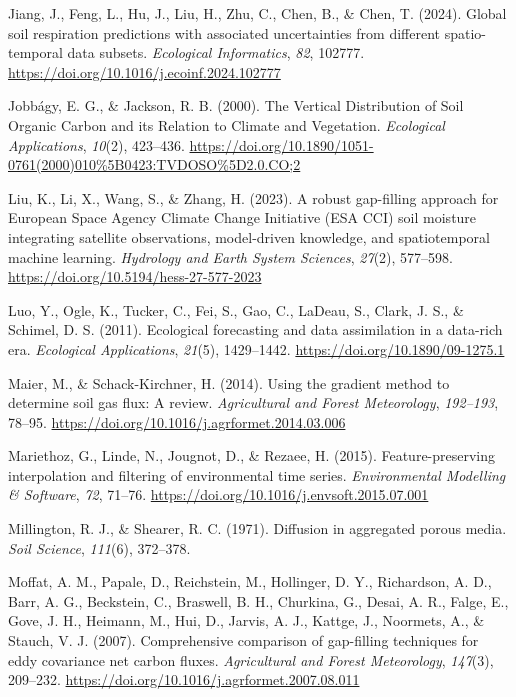 \documentclass[
  letterpaper,
  DIV=11,
  numbers=noendperiod]{scrartcl}
\newlength{\cslhangindent}
\newenvironment{CSLReferences}[2] %
 {\begin{list}{}{%
  \setlength{\itemindent}{0pt}
  \setlength{\leftmargin}{0pt}
  \setlength{\parsep}{0pt}
  \ifodd #1
   \setlength{\leftmargin}{\cslhangindent}
   \setlength{\itemindent}{-1\cslhangindent}
  \fi
  \setlength{\itemsep}{#2\baselineskip}}}
 {\end{list}}
\begin{document}
\begin{CSLReferences}{1}{0}
Jiang, J., Feng, L., Hu, J., Liu, H., Zhu, C., Chen, B., \& Chen, T.
(2024). Global soil respiration predictions with associated
uncertainties from different spatio-temporal data subsets.
\emph{Ecological Informatics}, \emph{82}, 102777.
\url{https://doi.org/10.1016/j.ecoinf.2024.102777}

Jobbágy, E. G., \& Jackson, R. B. (2000). The {Vertical Distribution} of
{Soil Organic Carbon} and its {Relation} to {Climate} and {Vegetation}.
\emph{Ecological Applications}, \emph{10}(2), 423--436.
\url{https://doi.org/10.1890/1051-0761(2000)010\%5B0423:TVDOSO\%5D2.0.CO;2}

Liu, K., Li, X., Wang, S., \& Zhang, H. (2023). A robust gap-filling
approach for {European Space Agency Climate Change Initiative} ({ESA
CCI}) soil moisture integrating satellite observations, model-driven
knowledge, and spatiotemporal machine learning. \emph{Hydrology and
Earth System Sciences}, \emph{27}(2), 577--598.
\url{https://doi.org/10.5194/hess-27-577-2023}

Luo, Y., Ogle, K., Tucker, C., Fei, S., Gao, C., LaDeau, S., Clark, J.
S., \& Schimel, D. S. (2011). Ecological forecasting and data
assimilation in a data-rich era. \emph{Ecological Applications},
\emph{21}(5), 1429--1442. \url{https://doi.org/10.1890/09-1275.1}

Maier, M., \& Schack-Kirchner, H. (2014). Using the gradient method to
determine soil gas flux: {A} review. \emph{Agricultural and Forest
Meteorology}, \emph{192--193}, 78--95.
\url{https://doi.org/10.1016/j.agrformet.2014.03.006}

Mariethoz, G., Linde, N., Jougnot, D., \& Rezaee, H. (2015).
Feature-preserving interpolation and filtering of environmental time
series. \emph{Environmental Modelling \& Software}, \emph{72}, 71--76.
\url{https://doi.org/10.1016/j.envsoft.2015.07.001}

Millington, R. J., \& Shearer, R. C. (1971). Diffusion in aggregated
porous media. \emph{Soil Science}, \emph{111}(6), 372--378.

Moffat, A. M., Papale, D., Reichstein, M., Hollinger, D. Y., Richardson,
A. D., Barr, A. G., Beckstein, C., Braswell, B. H., Churkina, G., Desai,
A. R., Falge, E., Gove, J. H., Heimann, M., Hui, D., Jarvis, A. J.,
Kattge, J., Noormets, A., \& Stauch, V. J. (2007). Comprehensive
comparison of gap-filling techniques for eddy covariance net carbon
fluxes. \emph{Agricultural and Forest Meteorology}, \emph{147}(3),
209--232. \url{https://doi.org/10.1016/j.agrformet.2007.08.011}


\end{CSLReferences}
\end{document}
